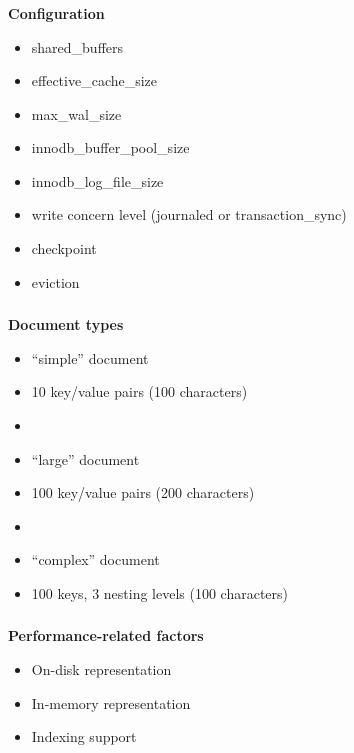 \documentclass[usenames,dvipsnames, 18pt, compress, aspectratio=169]{beamer}
\begin{document}
\begin{frame}
    \frametitle{}
    \begin{center}
        \textbf{Configuration}
        \begin{itemize}[label={}]
            \item shared\_buffers
            \item effective\_cache\_size
            \item max\_wal\_size
            \item innodb\_buffer\_pool\_size
            \item innodb\_log\_file\_size
            \item write concern level (journaled or transaction\_sync)
            \item checkpoint
            \item eviction
        \end{itemize}
    \end{center}
\end{frame}

\begin{frame}
    \frametitle{}
    \begin{center}
        \textbf{Document types}
        \begin{itemize}[label={}]
            \item “simple” document
            \item 10 key/value pairs (100 characters)
            \item
            \item “large” document
            \item 100 key/value pairs (200 characters)
            \item
            \item “complex” document
            \item 100 keys, 3 nesting levels (100 characters)
        \end{itemize}
    \end{center}
\end{frame}

\begin{frame}
    \frametitle{}
    \begin{center}
        \textbf{Performance-related factors}
        \pause
        \begin{itemize}[label={\MVRightarrow}]
            \item <+-> On-disk representation
            \item <+-> In-memory representation
            \item <+-> Indexing support
        \end{itemize}
    \end{center}
\end{frame}
\end{document}
